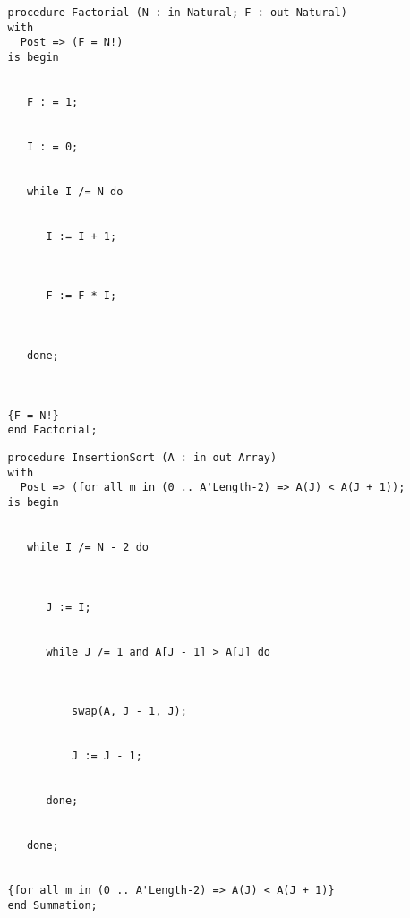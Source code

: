 \documentclass[11pt]{article}
\begin{document}
\begin{verbatim}
   procedure Factorial (N : in Natural; F : out Natural)
   with
     Post => (F = N!)
   is begin


      F : = 1;


      I : = 0;


      while I /= N do


         I := I + 1;



         F := F * I;



      done;



   {F = N!}
   end Factorial;

\end{verbatim}
\vfill


\pagebreak

\vfill

\begin{verbatim}
   procedure InsertionSort (A : in out Array)
   with
     Post => (for all m in (0 .. A'Length-2) => A(J) < A(J + 1));
   is begin


      while I /= N - 2 do



         J := I;


         while J /= 1 and A[J - 1] > A[J] do
     


             swap(A, J - 1, J);


             J := J - 1;


         done;


      done;


   {for all m in (0 .. A'Length-2) => A(J) < A(J + 1)}
   end Summation;

\end{verbatim}
\vfill

\pagebreak
\end{document}
